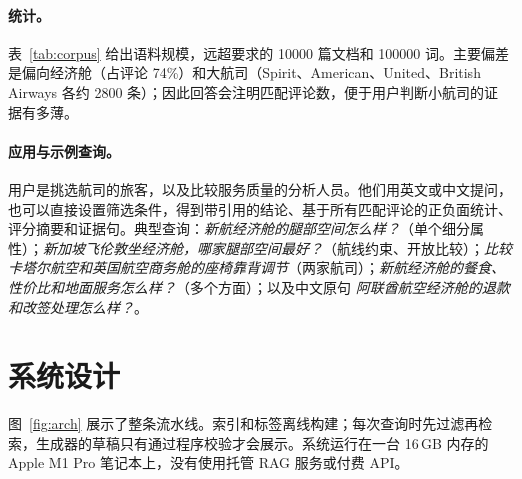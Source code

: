 \documentclass[10pt,twocolumn,a4paper]{article}
\begin{document}
\paragraph{统计。}表~\ref{tab:corpus} 给出语料规模，远超要求的 \num{10000} 篇文档和 \num{100000} 词。主要偏差是偏向经济舱（占评论 74\%）和大航司（Spirit、American、United、British Airways 各约 \num{2800} 条）；因此回答会注明匹配评论数，便于用户判断小航司的证据有多薄。

\paragraph{应用与示例查询。}用户是挑选航司的旅客，以及比较服务质量的分析人员。他们用英文或中文提问，也可以直接设置筛选条件，得到带引用的结论、基于所有匹配评论的正负面统计、评分摘要和证据句。典型查询：\emph{新航经济舱的腿部空间怎么样？}（单个细分属性）；\emph{新加坡飞伦敦坐经济舱，哪家腿部空间最好？}（航线约束、开放比较）；\emph{比较卡塔尔航空和英国航空商务舱的座椅靠背调节}（两家航司）；\emph{新航经济舱的餐食、性价比和地面服务怎么样？}（多个方面）；以及中文原句 \emph{阿联酋航空经济舱的退款和改签处理怎么样？}。

\section{系统设计}
\label{sec:method}

图~\ref{fig:arch} 展示了整条流水线。索引和标签离线构建；每次查询时先过滤再检索，生成器的草稿只有通过程序校验才会展示。系统运行在一台 16\,GB 内存的 Apple M1 Pro 笔记本上，没有使用托管 RAG 服务或付费 API。
\end{document}
